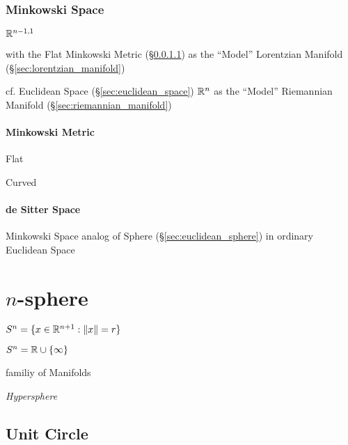 \subsubsection{Minkowski Space}\label{sec:minkowski_space}

$\mathbb{R}^{n-1,1}$

with the Flat Minkowski Metric (\S\ref{sec:minkowski_metric}) as the
``Model'' Lorentzian Manifold (\S\ref{sec:lorentzian_manifold})

cf. Euclidean Space (\S\ref{sec:euclidean_space}) $\mathbb{R}^n$ as the
``Model'' Riemannian Manifold (\S\ref{sec:riemannian_manifold})



\paragraph{Minkowski Metric}\label{sec:minkowski_metric}\hfill

Flat

Curved



\paragraph{de Sitter Space}\label{sec:desitter_space}\hfill

Minkowski Space analog of Sphere (\S\ref{sec:euclidean_sphere}) in ordinary
Euclidean Space



\section{$n$-sphere}\label{sec:n_sphere}

$S^n = \{ x \in \mathbb{R}^{n+1} : \|x\| = r \}$

$S^n = \mathbb{R} \cup \{\infty\}$

familiy of Manifolds

\emph{Hypersphere}



\subsection{Unit Circle}\label{sec:unit_circle}

